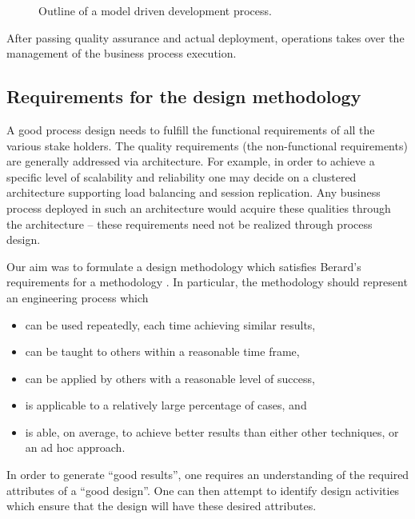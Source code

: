 \documentclass{IOS-Book-Article}
\begin{document}
\begin{figure}
  \centering
  \caption{Outline of a model driven development process.}
  \label{fig:developmentProcess}
\end{figure}

After passing quality assurance and actual deployment, operations takes over the management of the
business process execution.


\subsection{Requirements for the design methodology}

A good process design needs to fulfill the functional requirements of all the various stake
holders. The quality requirements (the non-functional requirements) are generally
addressed via architecture. For example, in order to achieve a specific level of scalability
and reliability one may decide on a clustered architecture supporting load balancing and
session replication. Any business process deployed in such an architecture would acquire
these qualities through the architecture -- these requirements need not be realized through 
process design.

Our aim was to formulate a design methodology which satisfies Berard's requirements for a methodology
\cite{berard:whatIsMethodology}. In particular, the methodology should represent an
engineering process which
\begin{itemize}
  \item can be used repeatedly, each time achieving similar results,
  \item can be taught to others within a reasonable time frame,
  \item can be applied by others with a reasonable level of success, 
  \item is applicable to a relatively large percentage of cases, and
  \item is able, on average, to achieve better results than either other techniques, or an ad hoc approach.
\end{itemize}

In order to generate ``good results'', one requires an understanding of the required attributes of a
``good design''. One can then attempt to identify design activities which ensure that the
design will have these desired attributes.
\end{document}
